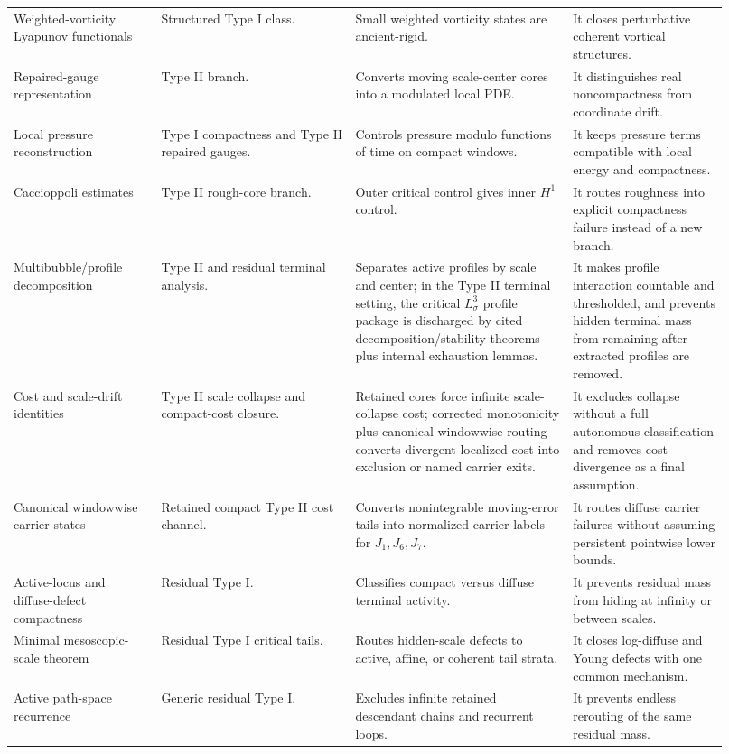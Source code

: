 \documentclass[11pt]{amsart}
\begin{document}
\begin{longtable}{@{}>{\raggedright\arraybackslash}p{0.19\linewidth}>{\raggedright\arraybackslash}p{0.25\linewidth}>{\raggedright\arraybackslash}p{0.28\linewidth}>{\raggedright\arraybackslash}p{0.20\linewidth}@{}}
Weighted-vorticity Lyapunov functionals & Structured Type I class. & Small weighted vorticity states are ancient-rigid. & It closes perturbative coherent vortical structures. \\
Repaired-gauge representation & Type II branch. & Converts moving scale-center cores into a modulated local PDE. & It distinguishes real noncompactness from coordinate drift. \\
Local pressure reconstruction & Type I compactness and Type II repaired gauges. & Controls pressure modulo functions of time on compact windows. & It keeps pressure terms compatible with local energy and compactness. \\
Caccioppoli estimates & Type II rough-core branch. & Outer critical control gives inner \(H^1\) control. & It routes roughness into explicit compactness failure instead of a new branch. \\
Multibubble/profile decomposition & Type II and residual terminal analysis. & Separates active profiles by scale and center; in the Type II terminal setting, the critical \(L^3_\sigma\) profile package is discharged by cited decomposition/stability theorems plus internal exhaustion lemmas. & It makes profile interaction countable and thresholded, and prevents hidden terminal mass from remaining after extracted profiles are removed. \\
Cost and scale-drift identities & Type II scale collapse and compact-cost closure. & Retained cores force infinite scale-collapse cost; corrected monotonicity plus canonical windowwise routing converts divergent localized cost into exclusion or named carrier exits. & It excludes collapse without a full autonomous classification and removes cost-divergence as a final assumption. \\
Canonical windowwise carrier states & Retained compact Type II cost channel. & Converts nonintegrable moving-error tails into normalized carrier labels for \(J_1,J_6,J_7\). & It routes diffuse carrier failures without assuming persistent pointwise lower bounds. \\
Active-locus and diffuse-defect compactness & Residual Type I. & Classifies compact versus diffuse terminal activity. & It prevents residual mass from hiding at infinity or between scales. \\
Minimal mesoscopic-scale theorem & Residual Type I critical tails. & Routes hidden-scale defects to active, affine, or coherent tail strata. & It closes log-diffuse and Young defects with one common mechanism. \\
Active path-space recurrence & Generic residual Type I. & Excludes infinite retained descendant chains and recurrent loops. & It prevents endless rerouting of the same residual mass. \\
\bottomrule
\end{longtable}
\end{document}
